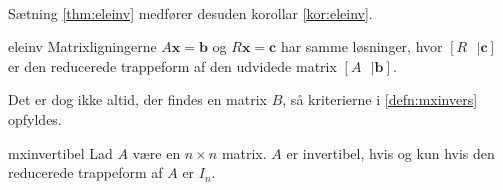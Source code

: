 %
\\
Sætning \ref{thm:eleinv} medfører desuden korollar \ref{kor:eleinv}.
\begin{kor}{}{eleinv}
Matrixligningerne $A\textbf{x}=\textbf{b}$ og $R\textbf{x}=\textbf{c}$ har samme løsninger, hvor 
$[R \text{   }| \textbf{c}]$
er den reducerede trappeform af den udvidede matrix 
$[A \text{   }| \textbf{b}].
$
\end{kor}\noindent
%
%
%
Det er dog ikke altid, der findes en matrix $B$, så kriterierne i \ref{defn:mxinvers} opfyldes. 
%
\begin{thm}{}{mxinvertibel}
Lad $A$ være en $n \times n$ matrix. 
$A$ er invertibel, hvis og kun hvis den reducerede trappeform af $A$ er $I_n$.
\end{thm}
%
